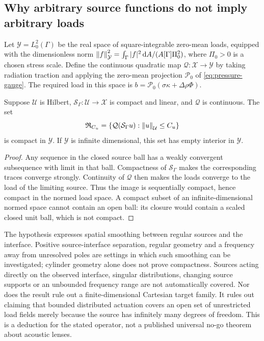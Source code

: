 \subsection{Why arbitrary source functions do not imply arbitrary loads}
Let $\mathcal Y=L^2_0(\Gamma)$ be the real space of square-integrable
zero-mean loads, equipped with the dimensionless norm
$\left\lVert f\right\rVert_{\mathcal Y}^2=\int_\Gamma |f|^2\,\mathrm d A/(A[\Gamma]\Pi_0^2)$,
where $\Pi_0>0$ is a chosen stress scale. Define the continuous quadratic
map $\mathcal Q:\mathcal X\to\mathcal Y$ by taking radiation traction
and applying the zero-mean projection $\mathcal P_0$ of
\cref{eq:pressure-gauge}. The required load in this space is
$b=\mathcal P_0(\sigma\kappa+\Delta\rho\Phi)$.

\begin{proposition}
Suppose $\mathcal U$ is Hilbert, $\mathcal S_\Gamma:\mathcal U\to\mathcal X$
is compact and linear, and $\mathcal Q$ is continuous. The set
\begin{equation}
 \mathfrak R_{C_u}=\{\mathcal Q(\mathcal S_\Gamma u):
                         \left\lVert u\right\rVert_{\mathcal U}\leq C_u\}
 \label{eq:bounded-reachable-set}
\end{equation}
is compact in $\mathcal Y$. If $\mathcal Y$ is infinite dimensional, this
set has empty interior in $\mathcal Y$.
\end{proposition}
\begin{proof}
Any sequence in the closed source ball has a weakly convergent subsequence
with limit in that ball. Compactness of $\mathcal S_\Gamma$ makes the
corresponding traces converge strongly. Continuity of $\mathcal Q$ then
makes the loads converge to the load of the limiting source. Thus the image
is sequentially compact, hence compact in the normed load space. A compact
subset of an infinite-dimensional normed space cannot contain an open ball:
its closure would contain a scaled closed unit ball, which is not compact.
\end{proof}

The hypothesis expresses spatial smoothing between regular sources and the
interface. Positive source-interface separation, regular geometry and a
frequency away from unresolved poles are settings in which such smoothing
can be investigated; cylinder geometry alone does not prove compactness.
Sources acting directly on the observed interface, singular distributions,
changing source supports or an unbounded frequency range are not automatically
covered. Nor does the result rule out a finite-dimensional Cartesian target
family. It rules out claiming that bounded distributed actuation covers an
open set of unrestricted load fields merely because the source has infinitely
many degrees of freedom. This is a deduction for the stated operator, not a
published universal no-go theorem about acoustic lenses.

